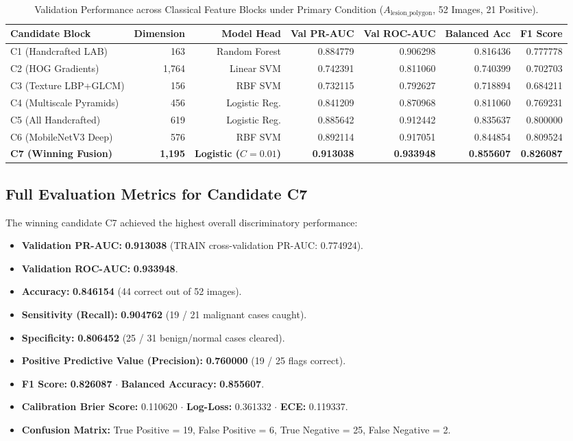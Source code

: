 \documentclass[11pt,a4paper]{report}
\begin{document}
\begin{table}[H]
\centering
\small
\begin{tabularx}{\textwidth}{lrrrrrr}
\toprule
\textbf{Candidate Block} & \textbf{Dimension} & \textbf{Model Head} & \textbf{Val PR-AUC} & \textbf{Val ROC-AUC} & \textbf{Balanced Acc} & \textbf{F1 Score} \\
\midrule
C1 (Handcrafted LAB) & 163 & Random Forest & 0.884779 & 0.906298 & 0.816436 & 0.777778 \\
C2 (HOG Gradients) & 1,764 & Linear SVM & 0.742391 & 0.811060 & 0.740399 & 0.702703 \\
C3 (Texture LBP+GLCM) & 156 & RBF SVM & 0.732115 & 0.792627 & 0.718894 & 0.684211 \\
C4 (Multiscale Pyramids) & 456 & Logistic Reg. & 0.841209 & 0.870968 & 0.811060 & 0.769231 \\
C5 (All Handcrafted) & 619 & Logistic Reg. & 0.885642 & 0.912442 & 0.835637 & 0.800000 \\
C6 (MobileNetV3 Deep) & 576 & RBF SVM & 0.892114 & 0.917051 & 0.844854 & 0.809524 \\
\midrule
\textbf{C7 (Winning Fusion)} & \textbf{1,195} & \textbf{Logistic ($C=0.01$)} & \textbf{0.913038} & \textbf{0.933948} & \textbf{0.855607} & \textbf{0.826087} \\
\bottomrule
\end{tabularx}
\caption{Validation Performance across Classical Feature Blocks under Primary Condition ($A_\text{lesion\_polygon}$, 52 Images, 21 Positive).}
\label{tab:classical_oral_val}
\end{table}

\subsection{Full Evaluation Metrics for Candidate C7}
The winning candidate C7 achieved the highest overall discriminatory performance:
\begin{itemize}
  \item \textbf{Validation PR-AUC:} \textbf{0.913038} (TRAIN cross-validation PR-AUC: 0.774924).
  \item \textbf{Validation ROC-AUC:} \textbf{0.933948}.
  \item \textbf{Accuracy:} \textbf{0.846154} (44 correct out of 52 images).
  \item \textbf{Sensitivity (Recall):} \textbf{0.904762} (19 / 21 malignant cases caught).
  \item \textbf{Specificity:} \textbf{0.806452} (25 / 31 benign/normal cases cleared).
  \item \textbf{Positive Predictive Value (Precision):} \textbf{0.760000} (19 / 25 flags correct).
  \item \textbf{F1 Score:} \textbf{0.826087} $\cdot$ \textbf{Balanced Accuracy:} \textbf{0.855607}.
  \item \textbf{Calibration Brier Score:} 0.110620 $\cdot$ \textbf{Log-Loss:} 0.361332 $\cdot$ \textbf{ECE:} 0.119337.
  \item \textbf{Confusion Matrix:} True Positive = 19, False Positive = 6, True Negative = 25, False Negative = 2.
\end{itemize}
\end{document}
